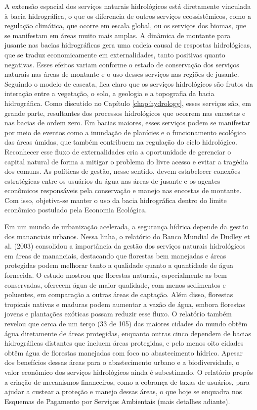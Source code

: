 \documentclass[./main.tex]{subfiles}
\begin{document}
\par A extensão espacial dos serviços naturais hidrológicos está diretamente vinculada à bacia hidrográfica, o que os diferencia de outros serviços ecossistêmicos, como a regulação climática, que ocorre em escala global, ou os serviços dos biomas, que se manifestam em áreas muito mais amplas. A dinâmica de montante para jusante nas bacias hidrográficas gera uma cadeia causal de respostas hidrológicas, que se traduz economicamente em externalidades, tanto positivas quanto negativas. Esses efeitos variam conforme o estado de conservação dos serviços naturais nas áreas de montante e o uso desses serviços nas regiões de jusante. Seguindo o modelo de cascata, fica claro que os serviços hidrológicos são frutos da interação entre a vegetação, o solo, a geologia e a topografia da bacia hidrográfica. Como discutido no Capítulo \ref{chap:hydrology}, esses serviços são, em grande parte, resultantes dos processos hidrológicos que ocorrem nas encostas e nas bacias de ordem zero. Em bacias maiores, esses serviços podem se manifestar por meio de eventos como a inundação de planícies e o funcionamento ecológico das áreas úmidas, que também contribuem na regulação do ciclo hidrológico. Reconhecer esse fluxo de externalidades cria a oportunidade de gerenciar o capital natural de forma a mitigar o problema do livre acesso e evitar a tragédia dos comuns. As políticas de gestão, nesse sentido, devem estabelecer conexões estratégicas entre os usuários da água nas áreas de jusante e os agentes econômicos responsáveis pela conservação e manejo nas encostas de montante. Com isso, objetiva-se manter o uso da bacia hidrográfica dentro do limite econômico postulado pela Economia Ecológica.

\par Em um mundo de urbanização acelerada, a segurança hídrica depende da gestão dos mananciais urbanos. Nessa linha, o relatório do Banco Mundial de Dudley et al. (2003) \cite{Dudley2003a} consolidou a importância da gestão dos serviços naturais hidrológicos em áreas de mananciais, destacando que florestas bem manejadas e áreas protegidas podem melhorar tanto a qualidade quanto a quantidade de água fornecida. O estudo mostrou que florestas naturais, especialmente as bem conservadas, oferecem água de maior qualidade, com menos sedimentos e poluentes, em comparação a outras áreas de captação. Além disso, florestas tropicais nativas e maduras podem aumentar a vazão de água, embora florestas jovens e plantações exóticas possam reduzir esse fluxo. O relatório também revelou que cerca de um terço (33 de 105) das maiores cidades do mundo obtêm água diretamente de áreas protegidas, enquanto outras cinco dependem de bacias hidrográficas distantes que incluem áreas protegidas, e pelo menos oito cidades obtêm água de florestas manejadas com foco no abastecimento hídrico. Apesar dos benefícios dessas áreas para o abastecimento urbano e a biodiversidade, o valor econômico dos serviços hidrológicos ainda é subestimado. O relatório propôs a criação de mecanismos financeiros, como a cobrança de taxas de usuários, para ajudar a custear a proteção e manejo dessas áreas, o que hoje se enquadra nos Esquemas de Pagamento por Serviços Ambientais (mais detalhes adiante).
\end{document}
